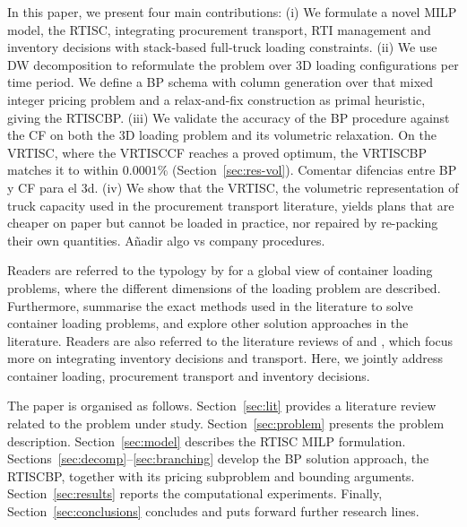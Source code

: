 In this paper, we present four main contributions:
(i) We formulate a novel \ac{MILP} model, the \ac{RTISC}, integrating procurement transport, \ac{RTI} management and inventory decisions with stack-based full-truck loading constraints.
(ii) We use \ac{DW} decomposition to reformulate the problem over 3D loading configurations per time period. We define a \ac{BP} schema with column generation over that mixed integer pricing problem and a relax-and-fix construction as primal heuristic, giving the \ac{RTISCBP}.
(iii) We validate the accuracy of the \ac{BP} procedure against the \ac{CF} on both the 3D loading problem and its volumetric relaxation.
On the \ac{VRTISC}, where the \ac{VRTISCCF} reaches a proved optimum, the \ac{VRTISCBP} matches it to within $0.0001\%$ (Section~\ref{sec:res-vol}).
{\color{red} Comentar difencias entre BP y CF para el 3d}.
(iv) We show that the \ac{VRTISC}, the volumetric representation of truck capacity used in the procurement transport literature, yields plans that are cheaper on paper but cannot be loaded in practice, nor repaired by re-packing their own quantities.
{\color{red} Añadir algo vs company procedures}.

Readers are referred to the typology by \autocite{Wascher2007AnProblems} for a global view of container loading problems, where the different dimensions of the loading problem are described.
Furthermore, \autocite{Silva2019ExactProblems} summarise the exact methods used in the literature to solve container loading problems, and \autocite{Zhao2016INTERNATIONALAlgorithms} explore other solution approaches in the literature.
Readers are also referred to the literature reviews of \autocite{Mosca2019IntegratedReview} and \autocite{Diaz-Madronero2015ADecisions}, which focus more on integrating inventory decisions and transport.
Here, we jointly address container loading, procurement transport and inventory decisions.

The paper is organised as follows.
Section~\ref{sec:lit} provides a literature review related to the problem under study.
Section~\ref{sec:problem} presents the problem description.
Section~\ref{sec:model} describes the \ac{RTISC} \ac{MILP} formulation.
Sections~\ref{sec:decomp}--\ref{sec:branching} develop the \ac{BP} solution approach, the \ac{RTISCBP}, together with its pricing subproblem and bounding arguments.
Section~\ref{sec:results} reports the computational experiments.
Finally, Section~\ref{sec:conclusions} concludes and puts forward further research lines.
